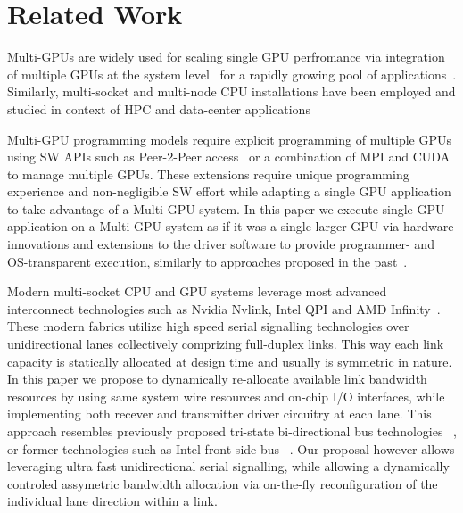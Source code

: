 
\section{Related Work}



Multi-GPUs are widely used for scaling single GPU perfromance
via integration of multiple GPUs at the system
level~\cite{pascal-tesla-wp,dgx,intersect360,titan_supercomputer} for a
rapidly growing pool of applications~\cite{coral,cudnn,Lavin15b,SimonyanZ14a}.
Similarly, multi-socket and multi-node CPU
installations have been employed and studied in context of HPC and
data-center applications~\cite{Intel:Xeon,IBM:Power,IBM:z196,AMD:Opteron}

Multi-GPU programming models require explicit programming of multiple GPUs
using SW APIs such as Peer-2-Peer access~\cite{NVIDIAP2P} or a combination of
MPI and CUDA~\cite{NVIDIAMPI} to manage multiple GPUs. These extensions require
unique programming experience and non-negligible SW effort while adapting a
single GPU application to take advantage of a Multi-GPU system. In this paper
we execute single GPU application on a Multi-GPU system as if it was a single
larger GPU via hardware innovations and extensions to the driver software to
provide programmer- and OS-transparent execution, similarly to approaches
proposed in the past~\cite{Cabezas2015,lee2013transparent,ben2015memory}.

Modern multi-socket CPU and GPU systems leverage most advanced interconnect
technologies such as Nvidia Nvlink, Intel QPI and AMD
Infinity~\cite{dgx,INTELQPI,AMDINFINITYFABRIC}. These modern fabrics utilize
high speed serial signalling technologies over unidirectional lanes
collectively comprizing full-duplex links. This way each link capacity is
statically allocated at design time and usually is symmetric in nature. In this
paper we propose to dynamically re-allocate available link bandwidth resources
by using same system wire resources and on-chip I/O interfaces, while
implementing both recever and transmitter driver circuitry at each lane. This
approach resembles previously proposed tri-state bi-directional bus
technologies ~\cite{tri-state}, or former technologies such as Intel front-side
bus ~\cite{fsb}. Our proposal however allows leveraging ultra fast
unidirectional serial signalling, while allowing a dynamically controled
assymetric bandwidth allocation via on-the-fly reconfiguration of the
individual lane direction within a link.

